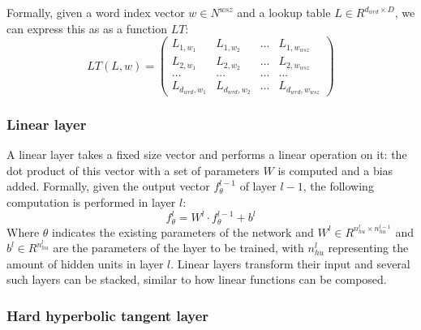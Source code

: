 Formally, given a word index vector $w \in N^{wsz}$ and a lookup table
$L \in R^{d_{wrd} \times D}$, we can express this as as a function
$LT$:
\begin{equation}
  LT(L, w) = \left( \begin{array}{cccc}
      L_{1,w_1} & L_{1,w_2} & \ldots & L_{1,w_{wsz}} \\
      L_{2,w_1} & L_{2,w_2} & \ldots & L_{2,w_{wsz}} \\
      \ldots   & \ldots  & \ldots & \ldots \\
      L_{d_{wrd},w_1} & L_{d_{wrd},w_2} & \ldots & L_{d_{wrd},w_{wsz}} \end{array} \right)
\end{equation}
\subsubsection{Linear layer}

A linear layer takes a fixed size vector and performs a linear
operation on it: the dot product of this vector with a set of
parameters $W$ is computed and a bias added. Formally, given the
output vector $f^{l-1}_\theta$ of layer $l-1$, the following
computation is performed in layer $l$:
\begin{equation}
  f^l_\theta = W^l \cdot f^{l-1}_\theta + b^l
\end{equation}
Where $\theta$ indicates the existing parameters of the network and
$W^l \in R^{n^l_{hu} \times n^{l-1}_{hu}} $ and $b^l \in R^{n^l_{hu}} $
are the parameters of the layer to be trained, with $n^l_{hu}$
representing the amount of hidden units in layer $l$. Linear layers
transform their input and several such layers can be stacked, similar
to how linear functions can be composed.

\subsubsection{Hard hyperbolic tangent layer}

